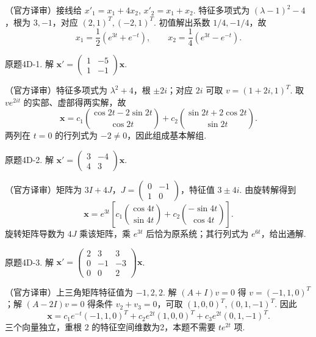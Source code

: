 \begin{solution}（官方译审）接线给 $x'_1=x_1+4x_2$, $x'_2=x_1+x_2$. 特征多项式为 $(\lambda-1)^2-4$，根为 $3,-1$，对应 $(2,1)^T,(-2,1)^T$. 初值解出系数 $1/4,-1/4$，故
\[x_1=\frac12(e^{3t}+e^{-t}),\qquad x_2=\frac14(e^{3t}-e^{-t}).\]
\end{solution}
\begin{exercise}\label{cw:bank-4D-1}原题4D-1. 解 $\mathbf x'=\begin{pmatrix}1&-5\\1&-1\end{pmatrix}\mathbf x$.\end{exercise}
\begin{solution}（官方译审）特征多项式为 $\lambda^2+4$，根 $\pm2i$；对应 $2i$ 可取 $v=(1+2i,1)^T$. 取 $ve^{2it}$ 的实部、虚部得两实解，故
\[\mathbf x=c_1\binom{\cos2t-2\sin2t}{\cos2t}+c_2\binom{\sin2t+2\cos2t}{\sin2t}.\]
两列在 $t=0$ 的行列式为 $-2\ne0$，因此组成基本解组.\end{solution}
\begin{exercise}\label{cw:bank-4D-2}原题4D-2. 解 $\mathbf x'=\begin{pmatrix}3&-4\\4&3\end{pmatrix}\mathbf x$.\end{exercise}
\begin{solution}（官方译审）矩阵为 $3I+4J$，$J=\begin{pmatrix}0&-1\\1&0\end{pmatrix}$，特征值 $3\pm4i$. 由旋转解得到
\[\mathbf x=e^{3t}\left[c_1\binom{\cos4t}{\sin4t}+c_2\binom{-\sin4t}{\cos4t}\right].\]
旋转矩阵导数为 $4J$ 乘该矩阵，乘 $e^{3t}$ 后恰为原系统；其行列式为 $e^{6t}$，给出通解.\end{solution}
\begin{exercise}\label{cw:bank-4D-3}原题4D-3. 解 $\mathbf x'=\begin{pmatrix}2&3&3\\0&-1&-3\\0&0&2\end{pmatrix}\mathbf x$.\end{exercise}
\begin{solution}（官方译审）上三角矩阵特征值为 $-1,2,2$. 解 $(A+I)v=0$ 得 $v=(-1,1,0)^T$；解 $(A-2I)v=0$ 得条件 $v_2+v_3=0$，可取 $(1,0,0)^T,(0,1,-1)^T$. 因此
\[\mathbf x=c_1e^{-t}(-1,1,0)^T+c_2e^{2t}(1,0,0)^T+c_3e^{2t}(0,1,-1)^T.\]
三个向量独立，重根 $2$ 的特征空间维数为2，本题不需要 $te^{2t}$ 项.\end{solution}
